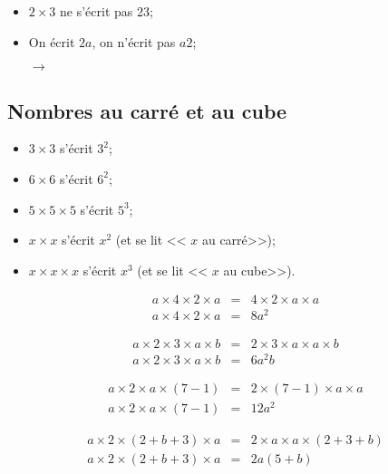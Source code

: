 \documentclass[12pt,a4paper]{article}
\begin{document}
\begin{myrem}
	
	\begin{itemize}
		\item $2 \times 3$ ne s'écrit pas $23$;
		\item On écrit $2a$, on n'écrit pas $a2$;
		\item[$\rightarrow$]  
	\end{itemize}
\end{myrem}


\subsection{Nombres au carré et au cube}

\begin{mymeth}
	
	\begin{itemize}
		\item $3 \times 3$ s'écrit $3^2$;
		\item $6 \times 6$ s'écrit $6^2$;
		\item $5 \times 5 \times 5$ s'écrit $5^3$;
	\end{itemize}
	
	\vspace*{0.25cm}
	
	\begin{itemize}
		
		\item $x \times x$ s'écrit $x^2$ (et se lit << $x$ au carré>>);
		\item $x \times x \times x$ s'écrit $x^3$ (et se lit << $x$ au cube>>).
	\end{itemize}
\end{mymeth}

\begin{myexs}
	\begin{eqnarray*}
		a \times 4 \times 2 \times a &=& 4 \times 2 \times  a \times a \\
		a \times 4 \times 2 \times a &=& 8a^2
	\end{eqnarray*}
	
	\begin{eqnarray*}
		a \times 2 \times 3 \times a \times b &=& 2 \times 3 \times a \times a \times b\\
		a \times 2 \times 3 \times a \times b &=& 6a^2b
	\end{eqnarray*}
	
	
	\begin{eqnarray*}
		a \times 2 \times a \times (7 - 1) &=& 2 \times (7 - 1) \times a \times a\\
		a \times 2 \times a \times (7 - 1) &=& 12a^2
	\end{eqnarray*}


	\begin{eqnarray*}
		a \times 2 \times (2 + b + 3) \times a &=& 2 \times a \times a \times (2 + 3 + b)\\
		a \times 2 \times (2 + b + 3) \times a &=& 2a(5+b)
	\end{eqnarray*}
\end{myexs}
\end{document}
